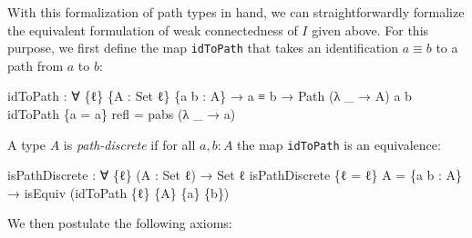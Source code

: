 \documentclass[
  12pt]{article}
\newenvironment{Shaded}{\begin{snugshade}}{\end{snugshade}}
\newcommand{\DataTypeTok}[1]{\textcolor[rgb]{0.00,0.34,0.68}{#1}}
\newcommand{\NormalTok}[1]{\textcolor[rgb]{0.12,0.11,0.11}{#1}}
\newcommand{\OtherTok}[1]{\textcolor[rgb]{0.00,0.43,0.16}{#1}}
\begin{document}
With this formalization of path types in hand, we can straightforwardly
formalize the equivalent formulation of weak connectedness of \(I\)
given above. For this purpose, we first define the map \texttt{idToPath}
that takes an identification \(a ≡ b\) to a path from \(a\) to \(b\):

\begin{Shaded}
\begin{Highlighting}[]
\NormalTok{idToPath }\OtherTok{:} \OtherTok{∀} \OtherTok{\{}\NormalTok{ℓ}\OtherTok{\}} \OtherTok{\{}\NormalTok{A }\OtherTok{:} \DataTypeTok{Set}\NormalTok{ ℓ}\OtherTok{\}} \OtherTok{\{}\NormalTok{a b }\OtherTok{:}\NormalTok{ A}\OtherTok{\}}
           \OtherTok{→}\NormalTok{ a ≡ b }\OtherTok{→}\NormalTok{ Path }\OtherTok{(λ} \OtherTok{\_} \OtherTok{→}\NormalTok{ A}\OtherTok{)}\NormalTok{ a b}
\NormalTok{idToPath }\OtherTok{\{}\NormalTok{a }\OtherTok{=}\NormalTok{ a}\OtherTok{\}}\NormalTok{ refl }\OtherTok{=}\NormalTok{ pabs }\OtherTok{(λ} \OtherTok{\_} \OtherTok{→}\NormalTok{ a}\OtherTok{)}
\end{Highlighting}
\end{Shaded}

A type \(A\) is \emph{path-discrete} if for all \(a,b : A\) the map
\texttt{idToPath} is an equivalence:

\begin{Shaded}
\begin{Highlighting}[]
\NormalTok{isPathDiscrete }\OtherTok{:} \OtherTok{∀} \OtherTok{\{}\NormalTok{ℓ}\OtherTok{\}} \OtherTok{(}\NormalTok{A }\OtherTok{:} \DataTypeTok{Set}\NormalTok{ ℓ}\OtherTok{)} \OtherTok{→} \DataTypeTok{Set}\NormalTok{ ℓ}
\NormalTok{isPathDiscrete }\OtherTok{\{}\NormalTok{ℓ }\OtherTok{=}\NormalTok{ ℓ}\OtherTok{\}}\NormalTok{ A }\OtherTok{=} 
    \OtherTok{\{}\NormalTok{a b }\OtherTok{:}\NormalTok{ A}\OtherTok{\}} \OtherTok{→}\NormalTok{ isEquiv }\OtherTok{(}\NormalTok{idToPath }\OtherTok{\{}\NormalTok{ℓ}\OtherTok{\}} \OtherTok{\{}\NormalTok{A}\OtherTok{\}} \OtherTok{\{}\NormalTok{a}\OtherTok{\}} \OtherTok{\{}\NormalTok{b}\OtherTok{\})}
\end{Highlighting}
\end{Shaded}

We then postulate the following axioms:
\end{document}
